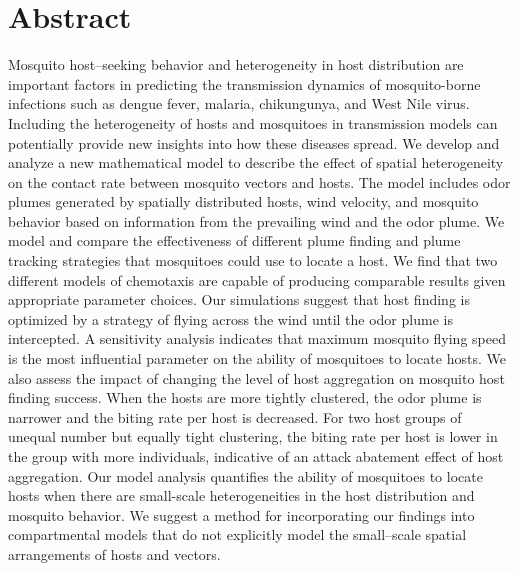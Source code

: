 \documentclass[10pt]{article}
\begin{document}
\section*{Abstract}
Mosquito host--seeking behavior and heterogeneity in host distribution are important factors
in predicting the transmission dynamics of mosquito-borne infections such as dengue fever, malaria, chikungunya, and West Nile virus. Including the heterogeneity of hosts and mosquitoes in transmission models can potentially provide new insights into how these diseases spread. 
We develop and analyze a new mathematical model to describe the effect of spatial
heterogeneity on the contact rate between mosquito vectors and hosts. The model includes odor 
plumes generated by spatially distributed hosts, wind velocity,
and mosquito behavior based on information from the prevailing wind and the odor plume.
We model and compare the effectiveness of different plume finding and plume tracking strategies that mosquitoes could use to locate a host. We find that two different models of chemotaxis are capable of producing comparable results given appropriate parameter choices. Our simulations suggest that host finding is optimized by a strategy of flying across the wind until the odor plume is intercepted.  
A sensitivity analysis indicates that maximum mosquito flying speed is the most influential parameter on the ability of mosquitoes to locate hosts. 
We also assess the impact of changing the level of host aggregation on mosquito host finding success.
When the hosts are more tightly clustered, the odor plume is narrower and the biting rate per host is decreased. For two host groups of unequal number but equally tight clustering, the biting rate per host is lower in the group with more individuals, indicative of an attack abatement effect of host aggregation. Our model analysis quantifies the ability of mosquitoes to locate hosts when there are small-scale heterogeneities in the host distribution and mosquito behavior. We suggest a method for incorporating our findings into compartmental models that do not explicitly model the small--scale spatial arrangements of hosts and vectors.

\end{document}
